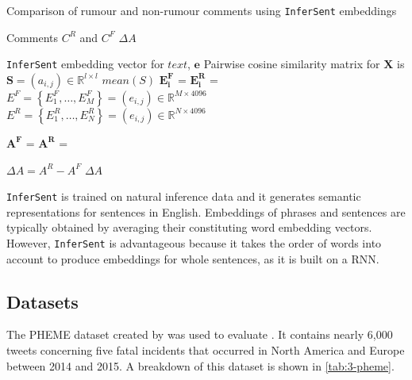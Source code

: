 \begin{algorithm}
\caption{Comparison of rumour and non-rumour comments using \texttt{InferSent} embeddings}\label{3-infersent}
\begin{algorithmic}[1]
\Require Comments $C^R$ and $C^F$
\Ensure $\Delta A$
\item[]
  \State\Return \texttt{InferSent} embedding vector for $text$, $\mathbf{e}$ 
\EndFunction
{}
  \State Pairwise cosine similarity matrix for $\bm{X}$ is $\bm{S} = (a_{i,j}) \in \mathbb{R}^{l \times l}$
  \State\Return $mean(S)$ 
\EndFunction
{}
  \State $\bm{E_i^F}$ = 
\EndFor
{}
  \State $\bm{E_i^R}$ = 
\EndFor
\State $E^F = \left\{ E_1^F, \ldots, E_M^F \right\} = (e_{i,j}) \in \mathbb{R}^{M \times 4096}$
\State $E^R = \left\{ E_1^R, \ldots, E_N^R \right\} = (e_{i,j}) \in \mathbb{R}^{N \times 4096}$

\State $\bm{A^F}$ = 
\State $\bm{A^R}$ = 

\State $\Delta A = A^R - A^F$
\State\Return $\Delta A$
\end{algorithmic}
\end{algorithm}

\texttt{InferSent} is trained on natural inference data and it generates semantic representations for sentences in English. Embeddings of phrases and sentences are typically obtained by averaging their constituting word embedding vectors. However, \texttt{InferSent} is advantageous because it takes the order of words into account to produce embeddings for whole sentences, as it is built on a \ac{RNN}.

\subsection{Datasets}
\label{ssec:3-datasets}

The PHEME dataset created by  was used to evaluate . It contains nearly 6,000 tweets concerning five fatal incidents that occurred in North America and Europe between 2014 and 2015. A breakdown of this dataset is shown in \autoref{tab:3-pheme}.

